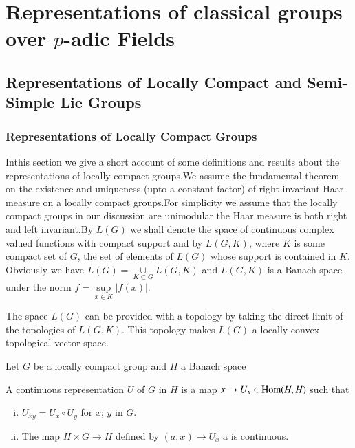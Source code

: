 \part{Representations of classical groups over $p$-adic Fields}\label{part2}

\chapter[Representations of Locally Compact and Semi-Simple...]{Representations of Locally Compact and Semi-Simple Lie
  Groups}\label{part2:chap1} 

\section{Representations of Locally Compact Groups}\label{part2:chap1:sec1}

In\pageoriginale this section we give a short account of some definitions and
results about the representations of locally compact groups.We assume
the fundamental theorem on the existence and uniqueness (upto a
constant factor) of right invariant Haar measure on a locally compact
groups.For simplicity we assume that the locally compact groups in our
discussion are unimodular \iec  the Haar measure is both right and
left invariant.By $L(G)$ we shall denote the space of continuous
complex valued functions with compact support and by $L(G,K)$, where
$K$ is some compact set of $G$, the set of elements of $L(G)$ whose
support is contained in $K$. Obviously we have $L(G)=\underset{K
  \subset G}{\cup} L(G,K)$ and $L(G,K)$ is a Banach space under the norm
$f = \underset {x \in K} \sup |f(x)|$. 

The space $L(G)$ can be provided with a topology by taking the direct
limit of the topologies of $L(G,K)$. This topology makes $L(G)$ a
locally convex topological vector space. 

Let $G$ be a locally compact group and $H$ a Banach space

\begin{definition}\label{part2:chap1:sec1:def1}
  A continuous representation $U$ of $G$ in $H$ is a map $x \to U_x
  \in  \operatorname{Hom} (H,H)$ such that 
  \begin{enumerate}[(i)]
  \item $ U_{xy} = U_x\circ U_y $ for $x$; $y$ in $G$.
  \item The map $H \times G \to H$ defined by $(a,x) \to U_x $ a is continuous.
  \end{enumerate}
\end{definition}


